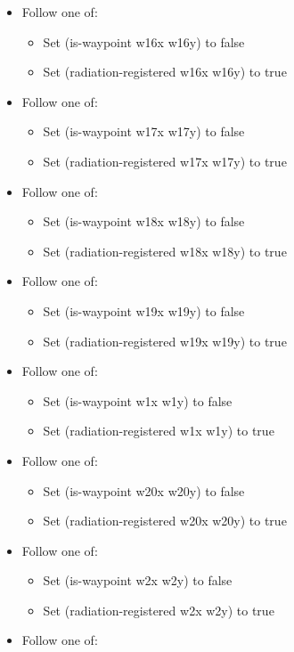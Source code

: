 \documentclass[a4paper,12pt]{article}
\newcommand{\exprn}[1]{{\sf #1}}
\begin{document}
\begin{enumerate}
\begin{itemize}
\begin{itemize}
\begin{itemize}
\end{itemize}\item Follow one of:
\begin{itemize}\item Set \exprn{(is-waypoint w16x w16y)} to false
\item Set \exprn{(radiation-registered w16x w16y)} to true
\end{itemize}\item Follow one of:
\begin{itemize}\item Set \exprn{(is-waypoint w17x w17y)} to false
\item Set \exprn{(radiation-registered w17x w17y)} to true
\end{itemize}\item Follow one of:
\begin{itemize}\item Set \exprn{(is-waypoint w18x w18y)} to false
\item Set \exprn{(radiation-registered w18x w18y)} to true
\end{itemize}\item Follow one of:
\begin{itemize}\item Set \exprn{(is-waypoint w19x w19y)} to false
\item Set \exprn{(radiation-registered w19x w19y)} to true
\end{itemize}\item Follow one of:
\begin{itemize}\item Set \exprn{(is-waypoint w1x w1y)} to false
\item Set \exprn{(radiation-registered w1x w1y)} to true
\end{itemize}\item Follow one of:
\begin{itemize}\item Set \exprn{(is-waypoint w20x w20y)} to false
\item Set \exprn{(radiation-registered w20x w20y)} to true
\end{itemize}\item Follow one of:
\begin{itemize}\item Set \exprn{(is-waypoint w2x w2y)} to false
\item Set \exprn{(radiation-registered w2x w2y)} to true
\end{itemize}\item Follow one of:

\end{itemize}
\end{itemize}
\end{enumerate}
\end{document}
